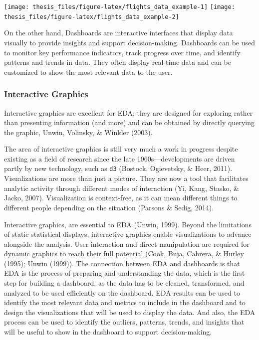 \documentclass[print]{nuthesis}
\begin{document}
\begin{center}\texttt{[image: thesis\_files/figure-latex/flights\_data\_example-1]} \texttt{[image: thesis\_files/figure-latex/flights\_data\_example-2]} \end{center}

On the other hand, Dashboards are interactive interfaces that display data visually to provide insights and support decision-making.
Dashboards can be used to monitor key performance indicators, track progress over time, and identify patterns and trends in data.
They often display real-time data and can be customized to show the most relevant data to the user.

\hypertarget{interactive-graphics}{%
\subsubsection{Interactive Graphics}\label{interactive-graphics}}

Interactive graphics are excellent for EDA; they are designed for exploring rather than presenting information (and more) and can be obtained by directly querying the graphic, Unwin, Volinsky, \& Winkler (2003).

The area of interactive graphics is still very much a work in progress despite existing as a field of research since the late 1960s---developments are driven partly by new technology, such as \texttt{d3} (Bostock, Ogievetsky, \& Heer, 2011).
Visualizations are more than just a picture.
They are now a tool that facilitates analytic activity through different modes of interaction (Yi, Kang, Stasko, \& Jacko, 2007).
Visualization is context-free, as it can mean different things to different people depending on the situation (Parsons \& Sedig, 2014).

Interactive graphics, are essential to EDA (Unwin, 1999).
Beyond the limitations of static statistical displays, interactive graphics enable visualizations to advance alongside the analysis.
User interaction and direct manipulation are required for dynamic graphics to reach their full potential (Cook, Buja, Cabrera, \& Hurley (1995); Unwin (1999)).
The connection between EDA and dashboards is that EDA is the process of preparing and understanding the data, which is the first step for building a dashboard, as the data has to be cleaned, transformed, and analyzed to be used efficiently on the dashboard.
EDA results can be used to identify the most relevant data and metrics to include in the dashboard and to design the visualizations that will be used to display the data.
And also, the EDA process can be used to identify the outliers, patterns, trends, and insights that will be useful to show in the dashboard to support decision-making.
\end{document}
